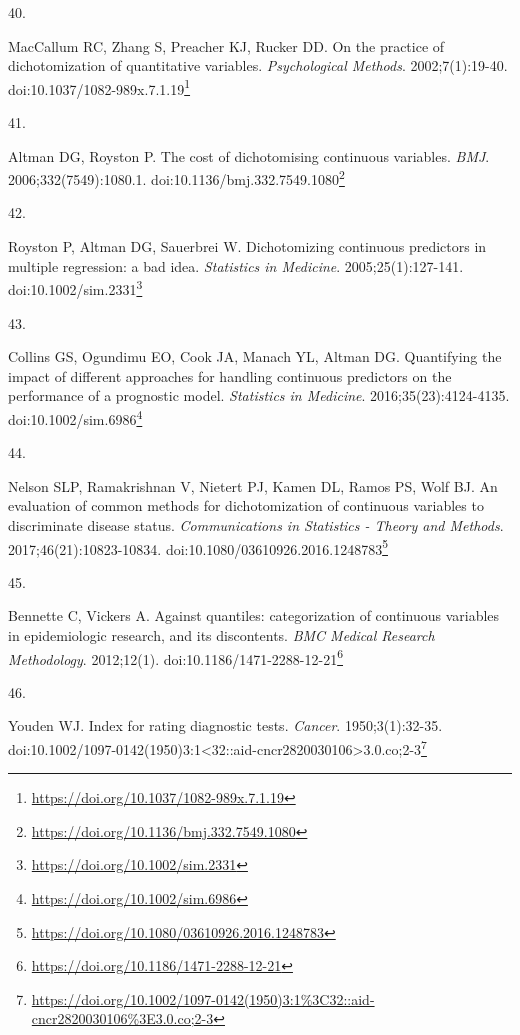 \documentclass[
]{book}
\newlength{\cslhangindent}
\newlength{\csllabelwidth}
\newlength{\cslentryspacingunit} %
\newenvironment{CSLReferences}[2] %
 {%
  \setlength{\parindent}{0pt}
  \ifodd #1
  \let\oldpar\par
  \def\par{\hangindent=\cslhangindent\oldpar}
  \fi
  \setlength{\parskip}{#2\cslentryspacingunit}
 }%
 {}
\newcommand{\CSLLeftMargin}[1]{\parbox[t]{\csllabelwidth}{#1}}
\newcommand{\CSLRightInline}[1]{\parbox[t]{\linewidth - \csllabelwidth}{#1}\break}
\renewcommand{\href}[2]{#2\footnote{\url{#1}}}
\begin{document}
\begin{CSLReferences}{0}{0}
\leavevmode{}%
\CSLLeftMargin{40. }%
\CSLRightInline{MacCallum RC, Zhang S, Preacher KJ, Rucker DD. On the practice of dichotomization of quantitative variables. \emph{Psychological Methods}. 2002;7(1):19-40. doi:\href{https://doi.org/10.1037/1082-989x.7.1.19}{10.1037/1082-989x.7.1.19}}

\leavevmode{}%
\CSLLeftMargin{41. }%
\CSLRightInline{Altman DG, Royston P. The cost of dichotomising continuous variables. \emph{BMJ}. 2006;332(7549):1080.1. doi:\href{https://doi.org/10.1136/bmj.332.7549.1080}{10.1136/bmj.332.7549.1080}}

\leavevmode{}%
\CSLLeftMargin{42. }%
\CSLRightInline{Royston P, Altman DG, Sauerbrei W. Dichotomizing continuous predictors in multiple regression: a bad idea. \emph{Statistics in Medicine}. 2005;25(1):127-141. doi:\href{https://doi.org/10.1002/sim.2331}{10.1002/sim.2331}}

\leavevmode{}%
\CSLLeftMargin{43. }%
\CSLRightInline{Collins GS, Ogundimu EO, Cook JA, Manach YL, Altman DG. Quantifying the impact of different approaches for handling continuous predictors on the performance of a prognostic model. \emph{Statistics in Medicine}. 2016;35(23):4124-4135. doi:\href{https://doi.org/10.1002/sim.6986}{10.1002/sim.6986}}

\leavevmode{}%
\CSLLeftMargin{44. }%
\CSLRightInline{Nelson SLP, Ramakrishnan V, Nietert PJ, Kamen DL, Ramos PS, Wolf BJ. An evaluation of common methods for dichotomization of continuous variables to discriminate disease status. \emph{Communications in Statistics - Theory and Methods}. 2017;46(21):10823-10834. doi:\href{https://doi.org/10.1080/03610926.2016.1248783}{10.1080/03610926.2016.1248783}}

\leavevmode{}%
\CSLLeftMargin{45. }%
\CSLRightInline{Bennette C, Vickers A. Against quantiles: categorization of continuous variables in epidemiologic research, and its discontents. \emph{BMC Medical Research Methodology}. 2012;12(1). doi:\href{https://doi.org/10.1186/1471-2288-12-21}{10.1186/1471-2288-12-21}}

\leavevmode{}%
\CSLLeftMargin{46. }%
\CSLRightInline{Youden WJ. Index for rating diagnostic tests. \emph{Cancer}. 1950;3(1):32-35. doi:\href{https://doi.org/10.1002/1097-0142(1950)3:1\%3C32::aid-cncr2820030106\%3E3.0.co;2-3}{10.1002/1097-0142(1950)3:1\textless32::aid-cncr2820030106\textgreater3.0.co;2-3}}


\end{CSLReferences}
\end{document}
